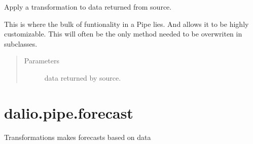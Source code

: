\documentclass[letterpaper,10pt,english]{sphinxmanual}
\begin{document}
\begin{fulllineitems}
\begin{fulllineitems}
\label{\detokenize{dalio.pipe:dalio.pipe.custom.Custom.transform}}
Apply a transformation to data returned from source.

This is where the bulk of funtionality in a Pipe lies. And allows it
to be highly customizable. This will often be the only method needed
to be overwriten in subclasses.
\begin{quote}\begin{description}
\item[{Parameters}] \leavevmode
{} \textendash{} data returned by source.

\end{description}\end{quote}

\end{fulllineitems}


\end{fulllineitems}



\section{dalio.pipe.forecast}
\label{\detokenize{dalio.pipe:module-dalio.pipe.forecast}}\label{\detokenize{dalio.pipe:dalio-pipe-forecast}}
Transformations makes forecasts based on data
\end{document}
